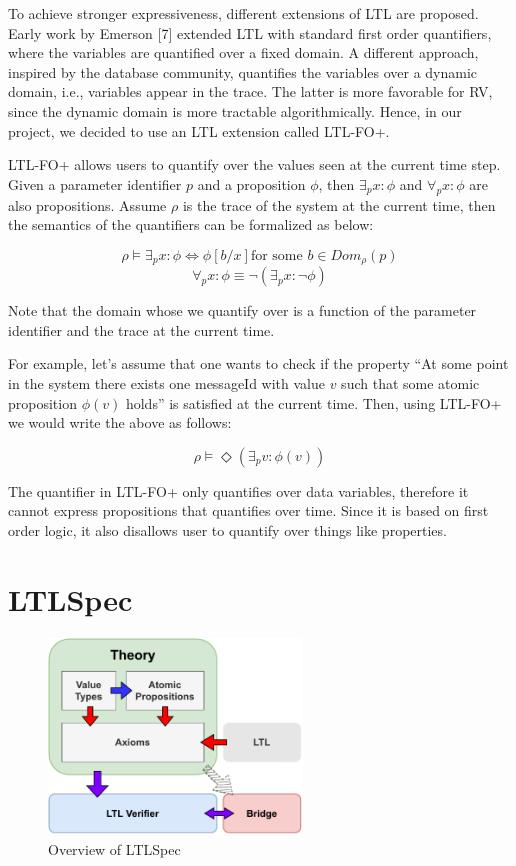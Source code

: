 \documentclass[format=acmsmall, nonacm=true, review=true, screen=true]{acmart}
\begin{document}
To achieve stronger expressiveness, different extensions of LTL are proposed. Early work by Emerson [7] extended LTL with standard first order quantifiers, where the variables are quantified over a fixed domain. A different approach, inspired by the database community, quantifies the variables over a dynamic domain, i.e., variables appear in the trace. The latter is more favorable for RV, since the dynamic domain is more tractable algorithmically. Hence, in our project, we decided to use an LTL extension called LTL-FO+.

LTL-FO+ allows users to quantify over the values seen at the current time step. Given a parameter identifier $p$ and a proposition $\phi$, then $\exists_{p} x : \phi$ and $\forall_{p} x:\phi$ are also propositions. Assume $\rho$ is the trace of the system at the current time, then the semantics of the quantifiers can be formalized as below:

$$\rho\vDash \exists_p x:\phi \Leftrightarrow \phi[b/x] \text{for some }b\in Dom_{\rho}(p)$$
$$\forall_{p} x : \phi \equiv \lnot(\exists_{p}x: \lnot\phi)$$

Note that the domain whose we quantify over is a function of the parameter identifier and the trace at the current time.

For example, let's assume that one wants to check if the property “At some point in the system there exists one messageId with value $v$ such that some atomic proposition $\phi(v)$ holds” is satisfied at the current time. Then, using LTL-FO+ we would write the above as follows:

$$ \rho \vDash \Diamond(\exists_{p} v :\phi(v)) $$


The quantifier in LTL-FO+ only quantifies over data variables, therefore it cannot express propositions that quantifies over time. Since it is based on first order logic, it also disallows user to quantify over things like properties.

\section{LTLSpec}

\begin{figure}[h]
  \includegraphics[width=0.6\textwidth]{images/ltlspec-overview.pdf}
  \centering
  \caption{Overview of LTLSpec}
  \label{fig:overview}
\end{figure}
\end{document}
